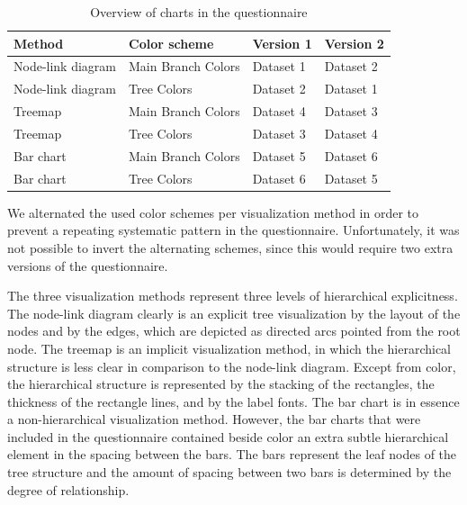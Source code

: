 \documentclass[review,journal]{vgtc}         %
\begin{document}
\begin{table}[!htb]
\begin{footnotesize}
\begin{tabular}{llll}
\toprule
Method & Color scheme & Version 1 & Version 2\\
\midrule
Node-link diagram & Main Branch Colors & Dataset 1 & Dataset 2\\
Node-link diagram & Tree Colors & Dataset 2 & Dataset 1\\
Treemap & Main Branch Colors & Dataset 4 & Dataset 3\\
Treemap & Tree Colors & Dataset 3 & Dataset 4\\
Bar chart & Main Branch Colors & Dataset 5 & Dataset 6\\
Bar chart & Tree Colors & Dataset 6 & Dataset 5\\
\bottomrule
\end{tabular}
\end{footnotesize}
\caption{Overview of charts in the questionnaire}\label{table:ques}
\end{table}

We alternated the used color schemes per visualization method in order to prevent a repeating systematic pattern in the questionnaire. Unfortunately, it was not possible to invert the alternating schemes, since this would require two extra versions of the questionnaire. 

The three visualization methods represent three levels of hierarchical explicitness. The node-link diagram clearly is an explicit tree visualization by the layout of the nodes and by the edges, which are depicted as directed arcs pointed from the root node. The treemap is an implicit visualization method, in which the hierarchical structure is less clear in comparison to the node-link diagram. Except from color, the hierarchical structure is represented by the stacking of the rectangles, the thickness of the rectangle lines, and by the label fonts. The bar chart is in essence a non-hierarchical visualization method. However, the bar charts that were included in the questionnaire contained beside color an extra subtle hierarchical element in the spacing between the bars. The bars represent the leaf nodes of the tree structure and the amount of spacing between two bars is determined by the degree of relationship.
\end{document}
